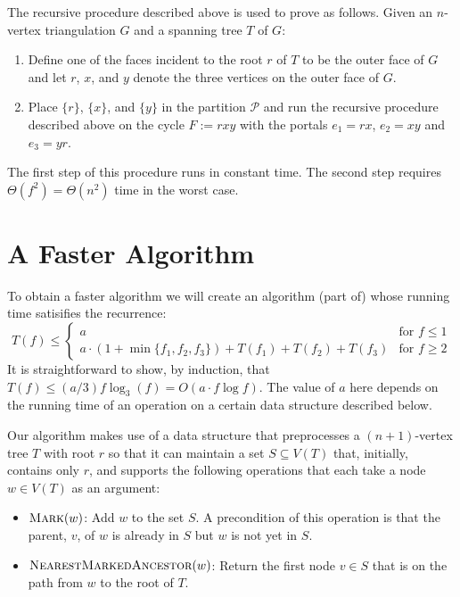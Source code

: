 \documentclass[kpfonts]{patmorin}
\let\le\leqslant
\let\ge\geqslant
\begin{document}
The recursive procedure described above is used to prove  as follows.  Given an $n$-vertex triangulation $G$ and a spanning tree $T$ of $G$:
\begin{enumerate}
  \item Define one of the faces incident to the root $r$ of $T$ to be the outer face of $G$ and let $r$, $x$, and $y$ denote the three vertices on the outer face of $G$.
  \item Place $\{r\}$, $\{x\}$, and $\{y\}$ in the partition $\mathcal{P}$ and run the recursive procedure described above on the cycle $F:=rxy$ with the portals $e_1=rx$, $e_2=xy$ and $e_3=yr$.
\end{enumerate}
The first step of this procedure runs in constant time.  The second step requires $\Theta(f^2)=\Theta(n^2)$ time in the worst case.

\section{A Faster Algorithm}

To obtain a faster algorithm we will create an algorithm (part of) whose running time satisifies the recurrence:
\[  T(f) \le \begin{cases}
         a & \text{for $f\le 1$} \\
         a\cdot(1+\min\{f_1,f_2,f_3\}) + T(f_1)+T(f_2)+T(f_3) & \text{for $f\ge 2$}
       \end{cases}
\]
It is straightforward to show, by induction, that $T(f)\le (a/3)f\log_3(f)=O(a\cdot f\log f)$.  The value of $a$ here depends on the running time of an operation on a certain data structure described below.

Our algorithm makes use of a data structure that preprocesses a $(n+1)$-vertex tree $T$ with root $r$ so that it can maintain a set $S\subseteq V(T)$ that, initially, contains only $r$, and supports the following operations that each take a node $w\in V(T)$ as an argument:

\begin{itemize}
    \item $\textsc{Mark}(w)$: Add $w$ to the set $S$.  A precondition of this operation is that the parent, $v$, of $w$ is already in $S$ but $w$ is not yet in $S$.

    \item $\textsc{NearestMarkedAncestor}(w)$:  Return the first node $v\in S$ that is on the path from $w$ to the root of $T$.
\end{itemize}
\end{document}
